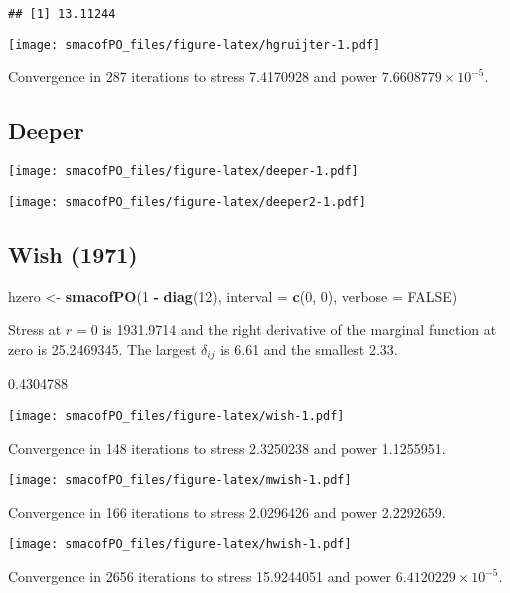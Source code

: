 \documentclass[
  12pt,
]{article}
\newenvironment{Shaded}{\begin{snugshade}}{\end{snugshade}}
\newcommand{\AttributeTok}[1]{\textcolor[rgb]{0.13,0.29,0.53}{#1}}
\newcommand{\ConstantTok}[1]{\textcolor[rgb]{0.56,0.35,0.01}{#1}}
\newcommand{\DecValTok}[1]{\textcolor[rgb]{0.00,0.00,0.81}{#1}}
\newcommand{\FunctionTok}[1]{\textcolor[rgb]{0.13,0.29,0.53}{\textbf{#1}}}
\newcommand{\NormalTok}[1]{#1}
\newcommand{\OtherTok}[1]{\textcolor[rgb]{0.56,0.35,0.01}{#1}}
\newcommand{\SpecialCharTok}[1]{\textcolor[rgb]{0.81,0.36,0.00}{\textbf{#1}}}
\begin{document}
\begin{verbatim}
## [1] 13.11244
\end{verbatim}

\texttt{[image: smacofPO\_files/figure-latex/hgruijter-1.pdf]}

Convergence in 287 iterations to stress 7.4170928 and power \ensuremath{7.6608779\times 10^{-5}}.

\subsection{Deeper}\label{deeper}

\texttt{[image: smacofPO\_files/figure-latex/deeper-1.pdf]}

\texttt{[image: smacofPO\_files/figure-latex/deeper2-1.pdf]}

\subsection{Wish (1971)}\label{wish_71}

\begin{Shaded}
\begin{Highlighting}[]
\NormalTok{hzero }\OtherTok{\textless{}{-}} \FunctionTok{smacofPO}\NormalTok{(}\DecValTok{1} \SpecialCharTok{{-}} \FunctionTok{diag}\NormalTok{(}\DecValTok{12}\NormalTok{), }\AttributeTok{interval =} \FunctionTok{c}\NormalTok{(}\DecValTok{0}\NormalTok{, }\DecValTok{0}\NormalTok{), }\AttributeTok{verbose =} \ConstantTok{FALSE}\NormalTok{)}
\end{Highlighting}
\end{Shaded}

Stress at \(r=0\) is 1931.9714 and the right derivative of the marginal function at zero is 25.2469345. The largest \(\delta_{ij}\) is 6.61 and the smallest 2.33.

0.4304788

\texttt{[image: smacofPO\_files/figure-latex/wish-1.pdf]}

Convergence in 148 iterations to stress 2.3250238 and power 1.1255951.

\texttt{[image: smacofPO\_files/figure-latex/mwish-1.pdf]}

Convergence in 166 iterations to stress 2.0296426 and power 2.2292659.

\texttt{[image: smacofPO\_files/figure-latex/hwish-1.pdf]}

Convergence in 2656 iterations to stress 15.9244051 and power \ensuremath{6.4120229\times 10^{-5}}.
\end{document}
